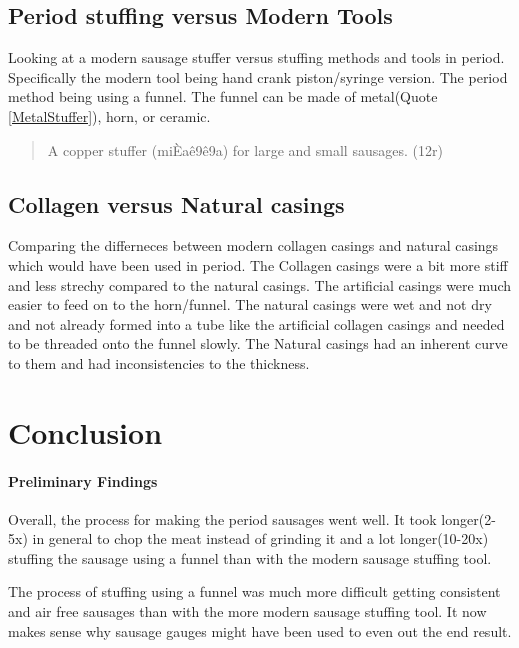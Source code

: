 \documentclass[letterpaper,11pt,leqno]{article}
\begin{document}
\FloatBarrier

\subsection{Period stuffing versus Modern Tools} 

Looking at a modern sausage stuffer versus stuffing methods and tools in period. Specifically the modern tool being hand crank piston/syringe version. The period method being using a funnel. The funnel can be made of metal(Quote \ref{MetalStuffer}), horn, or ceramic.

\begin{quote}
	A copper stuffer (miÈaê9ê9a) for large and small sausages. (12r) \linebreak
	 \citep[p. 87]{al2007annals}
	\label{MetalStuffer}
\end{quote}



\subsection{Collagen versus Natural casings}

Comparing the differneces between modern collagen casings and natural casings which would have been used in period.  
The Collagen casings were a bit more stiff and less strechy compared to the natural casings. The artificial casings were much easier to feed on to the horn/funnel. The natural casings were wet and not dry and not already formed into a tube like the artificial collagen casings and needed to be threaded onto the funnel slowly.
The Natural casings had an inherent curve to them and had inconsistencies to the thickness.



\section{Conclusion}\label{s:ccl}

\paragraph{Preliminary Findings}  Overall, the process for making the period sausages went well. It took longer(2-5x) in general to chop the meat instead of grinding it and a lot longer(10-20x) stuffing the sausage using a funnel than with the modern sausage stuffing tool. 

The process of stuffing using a funnel was much more difficult getting consistent and air free sausages than with the more modern sausage stuffing tool. It now makes sense why sausage gauges might have been used to even out the end result.
\end{document}
